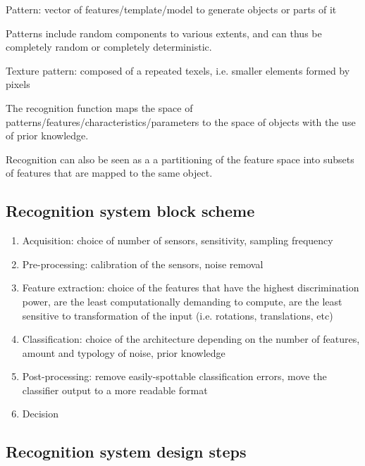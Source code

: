 \documentclass[oneside,onecolumn]{report}
\begin{document}
Pattern: vector of features/template/model to generate objects or parts of it

Patterns include random components to various extents, and can thus be completely random or completely deterministic.

Texture pattern: composed of a repeated texels, i.e. smaller elements formed by pixels

The recognition function maps the space of patterns/features/characteristics/parameters to the space of objects with the use of prior knowledge.

Recognition can also be seen as a a partitioning of the feature space into subsets of features that are mapped to the same object.


\subsection{Recognition system block scheme}

\begin{enumerate}
    \item Acquisition: choice of number of sensors, sensitivity, sampling frequency
    \item Pre-processing: calibration of the sensors, noise removal
    \item Feature extraction: choice of the features that have the highest discrimination power, are the least computationally demanding to compute, are the least sensitive to transformation of the input (i.e. rotations, translations, etc)
    \item Classification: choice of the architecture depending on the number of features, amount and typology of noise, prior knowledge
    \item Post-processing: remove easily-spottable classification errors, move the classifier output to a more readable format
    \item Decision
\end{enumerate}


\subsection{Recognition system design steps}
\end{document}
